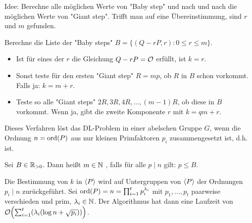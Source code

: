 \begin{bem}
	Idee: Berechne alle möglichen Werte von "Baby step" und nach und nach die möglichen Werte von "Giant step".
	Trifft man auf eine Übereinstimmung, sind $r$ und $m$ gefunden.
\end{bem}

\begin{anw}[Schritt 1]
	Berechne die Liste der "Baby steps" $B = \{(Q-rP,r) : 0 \leq r \leq m \}$.
\end{anw}

\begin{anw}[Schritt 2]
	\begin{itemize}
		\item Ist für eines der $r$ die Gleichung $Q - rP = \mathcal{O}$ erfüllt, ist $k = r$.
		\item Sonst teste für den ersten "Giant step" $R = mp$, ob $R$ in $B$ schon vorkommt.
		Falls ja: $k = m + r$.
		\item Teste so alle "Giant steps" $2R, 3R, 4R, \dots, (m-1)R$, ob diese in $B$ vorkommt.
		Wenn ja, gibt die zweite Komponente $r$ mit $k = qm+r$.
	\end{itemize}
\end{anw}

\begin{defn}
	Dieses Verfahren löst das DL-Problem in einer abelschen Gruppe $G$, wenn die Ordnung $n = \operatorname{ord}(P)$ aus nur kleinen Primfaktoren $p_i$ zusammengesetzt ist, d.h.  ist. 
\end{defn}

\begin{defn}[$B$-glatt]
	Sei $B \in \mathbb{R}_{>0}$.
	Dann heißt $m \in \mathbb{N}$ , falls für alle $p \mid n$ gilt: $p \leq B$.
\end{defn}

\begin{bem}
	Die Bestimmung von $k$ in $\langle P\rangle$ wird auf Untergruppen von $\langle P\rangle$ der Ordnungen $p_i \mid n$ zurückgeführt.
	Sei $\operatorname{ord}(P) = n = \prod_{i=1}^{t} p_i^{\lambda_i}$ mit $p_1, \dots, p_t$ paarweise verschieden und prim, $\lambda_i \in \mathbb{N}$.
	Der Algorithmus hat dann eine Laufzeit von $\oh \enbrace*{\sum_{i=1}^{t} (\lambda_i(\log n + \sqrt{p_i}))}$.
\end{bem}


